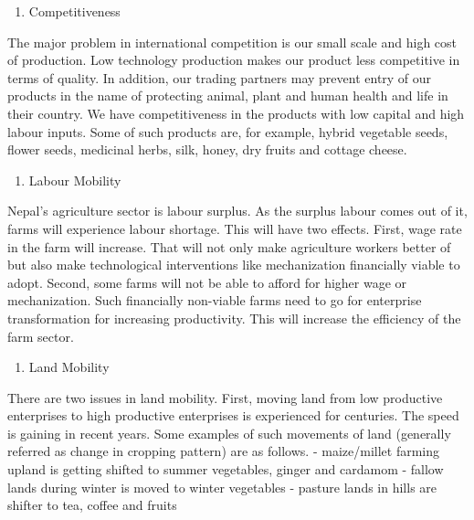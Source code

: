 \documentclass[
  openany]{book}
\providecommand{\tightlist}{%
  \setlength{\itemsep}{0pt}\setlength{\parskip}{0pt}}
\begin{document}
\begin{enumerate}
\def\labelenumi{\arabic{enumi}.}
\setcounter{enumi}{2}
\tightlist
\item
  Competitiveness
\end{enumerate}

The major problem in international competition is our small scale and high cost of production. Low technology production makes our product less competitive in terms of quality. In addition, our trading partners may prevent entry of our products in the name of protecting animal, plant and human health and life in their country. We have competitiveness in the products with low capital and high labour inputs. Some of such products are, for example, hybrid vegetable seeds, flower seeds, medicinal herbs, silk, honey, dry fruits and cottage cheese.

\begin{enumerate}
\def\labelenumi{\arabic{enumi}.}
\setcounter{enumi}{3}
\tightlist
\item
  Labour Mobility
\end{enumerate}

Nepal's agriculture sector is labour surplus. As the surplus labour comes out of it, farms will experience labour shortage. This will have two effects. First, wage rate in the farm will increase. That will not only make agriculture workers better of but also make technological interventions like mechanization financially viable to adopt. Second, some farms will not be able to afford for higher wage or mechanization. Such financially non-viable farms need to go for enterprise transformation for increasing productivity. This will increase the efficiency of the farm sector.

\begin{enumerate}
\def\labelenumi{\arabic{enumi}.}
\setcounter{enumi}{4}
\tightlist
\item
  Land Mobility
\end{enumerate}

There are two issues in land mobility. First, moving land from low productive enterprises to high productive enterprises is experienced for centuries. The speed is gaining in recent years. Some examples of such movements of land (generally referred as change in cropping pattern) are as follows.
- maize/millet farming upland is getting shifted to summer vegetables, ginger and cardamom
- fallow lands during winter is moved to winter vegetables
- pasture lands in hills are shifter to tea, coffee and fruits
\end{document}

